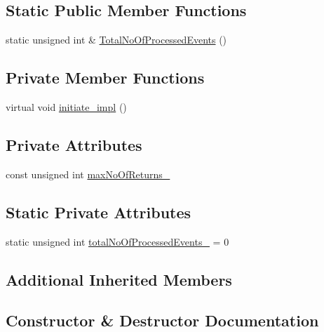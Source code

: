 \subsection*{Static Public Member Functions}
\begin{DoxyCompactItemize}
\item 
static unsigned int \& \mbox{\hyperlink{struct_player_a208d33c3bba5ae2d6617125813209713}{Total\+No\+Of\+Processed\+Events}} ()
\end{DoxyCompactItemize}
\subsection*{Private Member Functions}
\begin{DoxyCompactItemize}
\item 
virtual void \mbox{\hyperlink{struct_player_ae5001b1a7c1ba022d7bdb6d7da25e647}{initiate\+\_\+impl}} ()
\end{DoxyCompactItemize}
\subsection*{Private Attributes}
\begin{DoxyCompactItemize}
\item 
const unsigned int \mbox{\hyperlink{struct_player_aa6f40e0827e40725d7861e6e4cd8b2e2}{max\+No\+Of\+Returns\+\_\+}}
\end{DoxyCompactItemize}
\subsection*{Static Private Attributes}
\begin{DoxyCompactItemize}
\item 
static unsigned int \mbox{\hyperlink{struct_player_aee40ef0e7dcbcaf125e0383d098b4508}{total\+No\+Of\+Processed\+Events\+\_\+}} = 0
\end{DoxyCompactItemize}
\subsection*{Additional Inherited Members}


\subsection{Constructor \& Destructor Documentation}
\mbox{\label{struct_player_ac49e6a0d7a0f627228c3823c22aafe6b}} 
